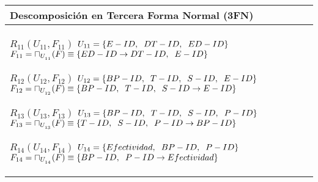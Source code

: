 \documentclass{report}
\begin{document}
\begin{tabularx}{\textwidth}{|X|}
        \bottomrule
    \end{tabularx}

    \begin{tabularx}{\textwidth}{|X|}
        \toprule
        \hfil \textbf{Descomposición en Tercera Forma Normal (3FN)} \\
        \midrule
        $ R_{11} ( U_{11} , F_{11} ) $ \newline 
        $ U_{11} = \{{E-ID, \hspace{0.2cm}  DT-ID, \hspace{0.2cm}  ED-ID}\} $ \newline 
        $ F_{11} = \sqcap_{U_{_{11}}}(F) \equiv \{ED-ID \rightarrow DT-ID, \hspace{0.2cm} E-ID \} $\newline 
        
        $ R_{12} ( U_{12} , F_{12} ) $ \newline 
        $ U_{12} = \{{BP-ID, \hspace{0.2cm}  T-ID, \hspace{0.2cm}  S-ID, \hspace{0.2cm}  E-ID}\} $ \newline 
        $ F_{12} = \sqcap_{U_{_{12}}}(F) \equiv \{BP-ID, \hspace{0.2cm} T-ID, \hspace{0.2cm} S-ID \rightarrow E-ID \} $\newline 
        
        $ R_{13} ( U_{13} , F_{13} ) $ \newline 
        $ U_{13} = \{{BP-ID, \hspace{0.2cm}  T-ID, \hspace{0.2cm}  S-ID, \hspace{0.2cm}  P-ID}\} $ \newline 
        $ F_{13} = \sqcap_{U_{_{13}}}(F) \equiv \{T-ID, \hspace{0.2cm} S-ID, \hspace{0.2cm} P-ID \rightarrow BP-ID \} $\newline 
        
        $ R_{14} ( U_{14} , F_{14} ) $ \newline 
        $ U_{14} = \{{Efectividad, \hspace{0.2cm}  BP-ID, \hspace{0.2cm}  P-ID}\} $ \newline 
        $ F_{14} = \sqcap_{U_{_{14}}}(F) \equiv \{BP-ID, \hspace{0.2cm} P-ID \rightarrow Efectividad \} $\newline 
        

\end{tabularx}
\end{document}
